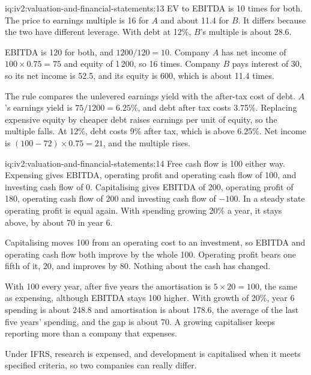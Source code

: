 \begin{solution}{iq:iv2:valuation-and-financial-statements:13}
EV to EBITDA is 10 times for both. The price to earnings multiple is 16 for $A$ and about 11.4 for $B$. It differs because the two have different leverage. With debt at 12\%, $B$'s multiple is about 28.6.

EBITDA is 120 for both, and $1200/120 = 10$. Company $A$ has net income of $100 \times 0.75 = 75$ and equity of 1\,200, so 16 times. Company $B$ pays interest of 30, so its net income is 52.5, and its equity is 600, which is about 11.4 times.

The rule compares the unlevered earnings yield with the after-tax cost of debt. $A$'s earnings yield is $75/1200 = 6.25\%$, and debt after tax costs 3.75\%. Replacing expensive equity by cheaper debt raises earnings per unit of equity, so the multiple falls. At 12\%, debt costs 9\% after tax, which is above 6.25\%. Net income is $(100 - 72) \times 0.75 = 21$, and the multiple rises.

\end{solution}

\begin{solution}{iq:iv2:valuation-and-financial-statements:14}
Free cash flow is 100 either way. Expensing gives EBITDA, operating profit and operating cash flow of 100, and investing cash flow of 0. Capitalising gives EBITDA of 200, operating profit of 180, operating cash flow of 200 and investing cash flow of $-100$. In a steady state operating profit is equal again. With spending growing 20\% a year, it stays above, by about 70 in year 6.

Capitalising moves 100 from an operating cost to an investment, so EBITDA and operating cash flow both improve by the whole 100. Operating profit bears one fifth of it, 20, and improves by 80. Nothing about the cash has changed.

With 100 every year, after five years the amortisation is $5 \times 20 = 100$, the same as expensing, although EBITDA stays 100 higher. With growth of 20\%, year 6 spending is about 248.8 and amortisation is about 178.6, the average of the last five years' spending, and the gap is about 70. A growing capitaliser keeps reporting more than a company that expenses.

Under IFRS, research is expensed, and development is capitalised when it meets specified criteria, so two companies can really differ.

\end{solution}

